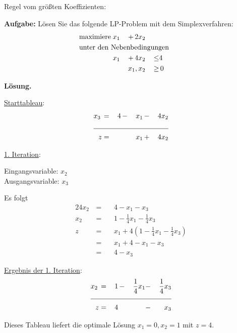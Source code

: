 \documentclass[10pt,a4paper,oneside,ngerman,numbers=noenddot]{scrartcl}
\begin{document}
	\subsection{} %
		\subsubsection{} %
			Regel vom größten Koeffizienten:
			
				\textbf{Aufgabe:} Lösen Sie das folgende LP-Problem mit dem Simplexverfahren:
		\begin{alignat*}{3}
			\text{maximiere}\; & x_{1} \,&+&\, 2x_{2} && \\
			\multicolumn{6}{l}{\text{unter den Nebenbedingungen}} && \\
			\;& x_{1} \,&+&\, 4x_{2} \,&\leq & 4 \\
			\multicolumn{4}{r}{$x_{1}, x_{2}$} \,&\geq &\, 0
		\end{alignat*}
		
		\textbf{Lösung.}
		
		\underline{Starttableau}:
		\begin{alignat*}{4}
			x_{3} \,&=&\, 4 \,&-&\, x_{1} \,&-&\, 4x_{2} \\ \cline{1 - 7}
			z &=& &&\, x_{1} \,&+&\, 4x_{2}
		\end{alignat*}
		
		\underline{1. Iteration}:
		
		Eingangsvariable: $x_{2}$\\
		Ausgangsvariable: $x_{3}$
		
		Es folgt
		\begin{alignat*}{2}
			4x_{2} \,&=&&\, 4 - x_{1}  - x_{3} \\
			x_{2} \,&=&&\, 1 - \frac{1}{4}x_{1} - \frac{1}{4}x_{3} \\
			z \,&=&&\, x_{1} + 4\left(1 - \frac{1}{4}x_{1} - \frac{1}{4}x_{3}\right) \\
			&=&&\, x_{1} + 4 - x_{1} - x_{3} \\
			&=&&\, 4 - x_{3}
		\end{alignat*}
		
		\underline{Ergebnis der 1. Iteration}:
		\begin{alignat*}{4}
			x_{2} \,&=&\, 1 \,&-&\, \frac{1}{4}x_{1} &-&\, \frac{1}{4}x_{3} \\ \cline{1 - 7}
			z &=& 4 \,&& &-&\, x_{3}
		\end{alignat*}
		
		Dieses Tableau liefert die optimale Lösung $x_{1} = 0, x_{2} = 1$ mit $z = 4$.
		
\end{document}
